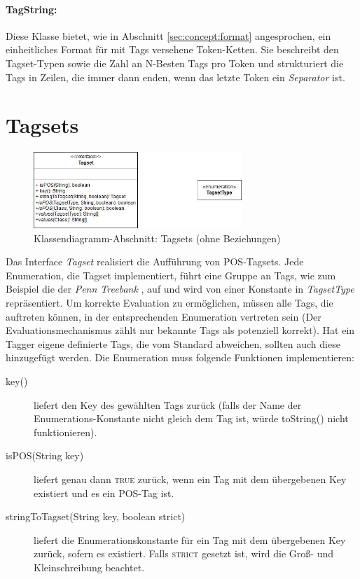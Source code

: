 \paragraph{TagString:} Diese Klasse bietet, wie in Abschnitt \ref{sec:concept:format} angesprochen, ein einheitliches Format für mit Tags versehene Token-Ketten. Sie beschreibt den Tagset-Typen sowie die Zahl an N-Besten Tags pro Token und strukturiert die Tags in Zeilen, die immer dann enden, wenn das letzte Token ein \textit{Separator} ist. 

\section{Tagsets}
\label{sec:impl:tagset}


\begin{figure}[htb]
	\centering
	\captionsetup{justification=centering,margin=2cm}
	\includegraphics[width=0.7\textwidth]{gfx/tagset_uml.jpg}
	
	\caption{Klassendiagramm-Abschnitt: Tagsets (ohne Beziehungen)} 
	\label{fig:impl:tagset:uml}
\end{figure}

Das Interface \textit{Tagset} realisiert die Aufführung von POS-Tagsets.
Jede Enumeration, die Tagset implementiert, führt eine Gruppe an Tags, wie zum Beispiel die der \textit{Penn Treebank} \cite{Paper:PennBank}, auf und wird von einer Konstante in \textit{TagsetType} repräsentiert. Um korrekte Evaluation zu ermöglichen, müssen alle Tags, die auftreten können, in der entsprechenden Enumeration vertreten sein (Der Evaluationsmechanismus zählt nur bekannte Tags als potenziell korrekt). Hat ein Tagger eigene definierte Tags, die vom Standard abweichen, sollten auch diese hinzugefügt werden. Die Enumeration muss folgende Funktionen implementieren:
\begin{description}
\item[key()] liefert den Key des gewählten Tags zurück (falls der Name der Enumerations-Konstante nicht gleich dem Tag ist, würde toString() nicht funktionieren).
\item[isPOS(String key)] liefert genau dann \textsc{true} zurück, wenn ein Tag mit dem übergebenen Key existiert und es ein POS-Tag ist.
\item[stringToTagset(String key, boolean strict)] liefert die Enumerationskonstante für ein Tag mit dem übergebenen Key zurück, sofern es existiert. Falls \textsc{strict} gesetzt ist, wird die Groß- und Kleinschreibung beachtet.
\end{description}


